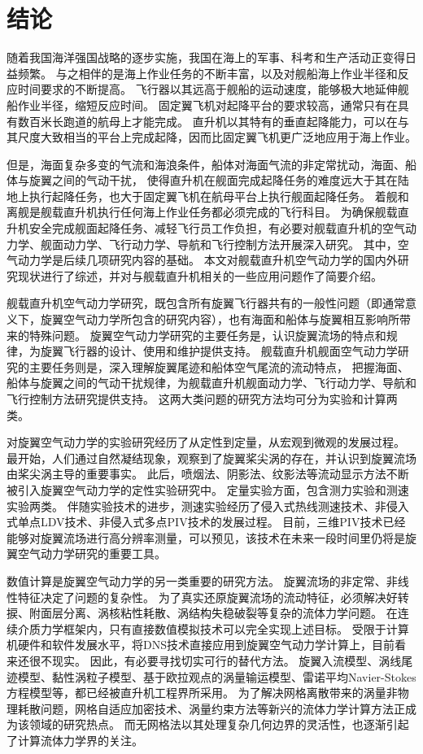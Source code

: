 \chapter{结论}
随着我国海洋强国战略的逐步实施，我国在海上的军事、科考和生产活动正变得日益频繁。
与之相伴的是海上作业任务的不断丰富，以及对舰船海上作业半径和反应时间要求的不断提高。
飞行器以其远高于舰船的运动速度，能够极大地延伸舰船作业半径，缩短反应时间。
固定翼飞机对起降平台的要求较高，通常只有在具有数百米长跑道的航母上才能完成。
直升机以其特有的垂直起降能力，可以在与其尺度大致相当的平台上完成起降，因而比固定翼飞机更广泛地应用于海上作业。

但是，海面复杂多变的气流和海浪条件，船体对海面气流的非定常扰动，海面、船体与旋翼之间的气动干扰，
使得直升机在舰面完成起降任务的难度远大于其在陆地上执行起降任务，也大于固定翼飞机在航母平台上执行舰面起降任务。
着舰和离舰是舰载直升机执行任何海上作业任务都必须完成的飞行科目。
为确保舰载直升机安全完成舰面起降任务、减轻飞行员工作负担，有必要对舰载直升机的空气动力学、舰面动力学、飞行动力学、导航和飞行控制方法开展深入研究。
其中，空气动力学是后续几项研究内容的基础。
本文对舰载直升机空气动力学的国内外研究现状进行了综述，并对与舰载直升机相关的一些应用问题作了简要介绍。

舰载直升机空气动力学研究，既包含所有旋翼飞行器共有的一般性问题（即通常意义下，旋翼空气动力学所包含的研究内容），也有海面和船体与旋翼相互影响所带来的特殊问题。
旋翼空气动力学研究的主要任务是，认识旋翼流场的特点和规律，为旋翼飞行器的设计、使用和维护提供支持。
舰载直升机舰面空气动力学研究的主要任务则是，深入理解旋翼尾迹和船体空气尾流的流动特点，
把握海面、船体与旋翼之间的气动干扰规律，为舰载直升机舰面动力学、飞行动力学、导航和飞行控制方法研究提供支持。
这两大类问题的研究方法均可分为实验和计算两类。

对旋翼空气动力学的实验研究经历了从定性到定量，从宏观到微观的发展过程。
最开始，人们通过自然凝结现象，观察到了旋翼桨尖涡的存在，并认识到旋翼流场由桨尖涡主导的重要事实。
此后，喷烟法、阴影法、纹影法等流动显示方法不断被引入旋翼空气动力学的定性实验研究中。
定量实验方面，包含测力实验和测速实验两类。
伴随实验技术的进步，测速实验经历了侵入式热线测速技术、非侵入式单点LDV技术、非侵入式多点PIV技术的发展过程。
目前，三维PIV技术已经能够对旋翼流场进行高分辨率测量，可以预见，该技术在未来一段时间里仍将是旋翼空气动力学研究的重要工具。

数值计算是旋翼空气动力学的另一类重要的研究方法。
旋翼流场的非定常、非线性特征决定了问题的复杂性。
为了真实还原旋翼流场的流动特征，必须解决好转捩、附面层分离、涡核粘性耗散、涡结构失稳破裂等复杂的流体力学问题。
在连续介质力学框架内，只有直接数值模拟技术可以完全实现上述目标。
受限于计算机硬件和软件发展水平，将DNS技术直接应用到旋翼空气动力学计算上，目前看来还很不现实。
因此，有必要寻找切实可行的替代方法。
旋翼入流模型、涡线尾迹模型、黏性涡粒子模型、基于欧拉观点的涡量输运模型、雷诺平均Navier-Stokes方程模型等，都已经被直升机工程界所采用。
为了解决网格离散带来的涡量非物理耗散问题，网格自适应加密技术、涡量约束方法等新兴的流体力学计算方法正成为该领域的研究热点。
而无网格法以其处理复杂几何边界的灵活性，也逐渐引起了计算流体力学界的关注。

